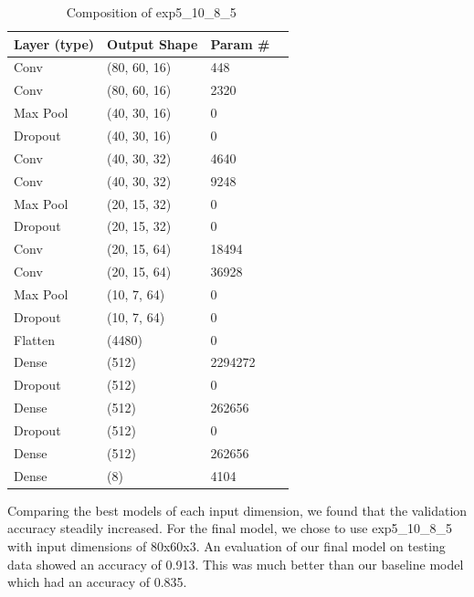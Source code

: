 \documentclass[twoside,twocolumn,9pt]{article}
\begin{document}
\begin{table}[h]
\small
  \caption{\ Composition of exp5\_10\_8\_5}
  \label{tbl:example1}
  \begin{tabular*}{0.48\textwidth}{@{\extracolsep{\fill}}llll}
    \hline
    Layer (type) & Output Shape & Param \# \\
    \hline
    Conv         & (80, 60, 16) & 448      \\
    Conv         & (80, 60, 16) & 2320     \\
    Max Pool     & (40, 30, 16) & 0        \\
    Dropout      & (40, 30, 16) & 0        \\
    Conv         & (40, 30, 32) & 4640     \\
    Conv         & (40, 30, 32) & 9248     \\
    Max Pool     & (20, 15, 32) & 0        \\
    Dropout      & (20, 15, 32) & 0        \\
    Conv         & (20, 15, 64) & 18494    \\
    Conv         & (20, 15, 64) & 36928    \\
    Max Pool     & (10, 7, 64)  & 0        \\
    Dropout      & (10, 7, 64)  & 0        \\
    Flatten      & (4480)       & 0        \\
    Dense        & (512)        & 2294272  \\
    Dropout      & (512)        & 0        \\
    Dense        & (512)        & 262656   \\
    Dropout      & (512)        & 0        \\
    Dense        & (512)        & 262656   \\
    Dense        & (8)          & 4104     \\
    \hline
  \end{tabular*}
\end{table}

\noindent Comparing the best models of each input dimension, we found that the validation accuracy steadily increased. For the final model, we chose to use exp5\_10\_8\_5 with input dimensions of 80x60x3. An evaluation of our final model on testing data showed an accuracy of 0.913. This was much better than our baseline model which had an accuracy of 0.835. 
\end{document}
